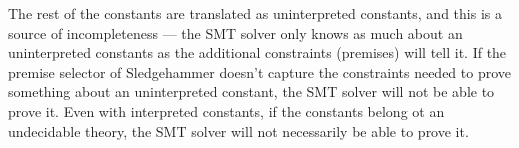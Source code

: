 \documentclass{article}
\begin{document}
		The rest of the constants are 
		translated as uninterpreted constants, 
		and this is a source of 
		incompleteness --- the SMT solver only 
		knows as much about an uninterpreted 
		constants as the additional constraints 
		(premises) will tell it. If the premise 
		selector of Sledgehammer doesn't capture 
		the constraints needed to prove something
		about an uninterpreted constant, the SMT 
		solver will not be able to prove it.
		Even with interpreted constants, if the 
		constants belong ot an undecidable theory,
		the SMT solver will not necessarily be 
		able to prove it.
		


\end{document}
